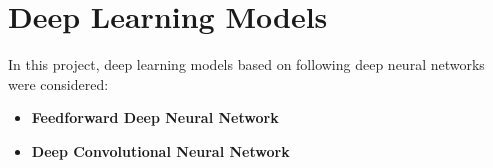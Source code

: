 \chapter{Deep Learning Models} %

\label{Chapter3} %

In this project, deep learning models based on following deep neural networks were considered:\\
\begin{itemize}
\item \textbf{Feedforward Deep Neural Network}
\item \textbf{Deep Convolutional Neural Network}
\end{itemize}
